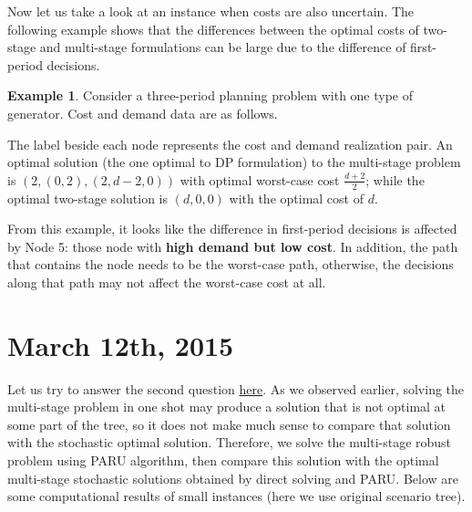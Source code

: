 \documentclass[10pt]{article}
\theoremstyle{plain}
\theoremstyle{definition}
\newtheorem{example}{Example}
\theoremstyle{remark}
\begin{document}
Now let us take a look at an instance when costs are also uncertain.
The following example shows that the differences between the optimal costs of
two-stage and multi-stage formulations can be large due to the difference of
first-period decisions.
\begin{example}\label{ms-ts-diff2}
	Consider a three-period planning problem with one type of generator.
	Cost and demand data are as follows.
	\begin{figure}[htb]
		\begin{center}
		\end{center}
	\end{figure}
	The label beside each node represents the cost and demand realization pair.
	An optimal solution (the one optimal to DP formulation) to the multi-stage problem
	is $(2,(0,2),(2,d-2,0))$ with optimal worst-case cost $\frac{d+2}{2}$;
	while the optimal two-stage solution is $(d,0,0)$ with the optimal cost of $d$.
	
	{\color{blue} From this example, it looks like the difference in first-period decisions is affected by Node 5: those node with {\bf high demand but low cost}. In addition, the path that contains the node needs to be the worst-case path, otherwise,
	the decisions along that path may not affect the worst-case cost at all.}
\end{example}

\section*{March 12th, 2015}
Let us try to answer the second question \hyperref[qlist_1]{here}.
As we observed earlier, solving the multi-stage problem in one shot may produce a solution
that is not optimal at some part of the tree, so it does not make much sense to compare that solution with the stochastic optimal solution.
Therefore, we solve the multi-stage robust problem using PARU algorithm, then compare this solution with the optimal multi-stage stochastic solutions obtained by direct solving and PARU. Below are some computational results of small instances (here we use original scenario tree).
\end{document}
